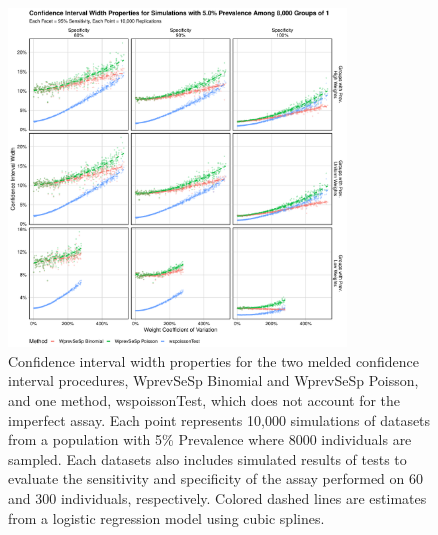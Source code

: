 \documentclass[AMA,STIX1COL]{WileyNJD-v2}
\begin{document}
\begin{figure}
\centering
\includegraphics[width=0.8\textwidth]{figures/imperfect_confidence_interval_width_8000_groups_0_05_prev}
\caption{Confidence interval width properties for the two melded confidence interval procedures, WprevSeSp Binomial and WprevSeSp Poisson, and one method, wspoissonTest, which does not account for the imperfect assay.
Each point represents 10,000 simulations of datasets from a population with 5\% Prevalence where 8000 individuals are sampled.
Each datasets also includes simulated results of tests to evaluate the sensitivity and specificity of the assay performed on 60 and 300 individuals, respectively.
Colored dashed lines are estimates from a logistic regression model using cubic splines.}
\label{fig:imperfect_confidence_interval_width_8000_groups_0_05_prev}
\end{figure}
\end{document}
